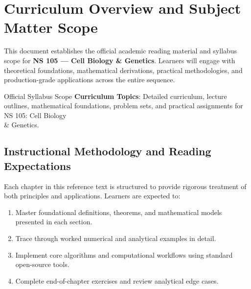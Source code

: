 \section{Curriculum Overview and Subject Matter Scope}

This document establishes the official academic reading material and syllabus scope for \textbf{NS 105 --- Cell Biology \& Genetics}. Learners will engage with theoretical foundations, mathematical derivations, practical methodologies, and production-grade applications across the entire sequence.

\begin{InsightBox}{Official Syllabus Scope}
  \textbf{Curriculum Topics}: Detailed curriculum, lecture outlines, mathematical foundations, problem sets, and practical assignments for NS 105: Cell Biology \\& Genetics.
\end{InsightBox}

\subsection{Instructional Methodology and Reading Expectations}

Each chapter in this reference text is structured to provide rigorous treatment of both principles and applications. Learners are expected to:
\begin{enumerate}
  \item Master foundational definitions, theorems, and mathematical models presented in each section.
  \item Trace through worked numerical and analytical examples in detail.
  \item Implement core algorithms and computational workflows using standard open-source tools.
  \item Complete end-of-chapter exercises and review analytical edge cases.
\end{enumerate}

